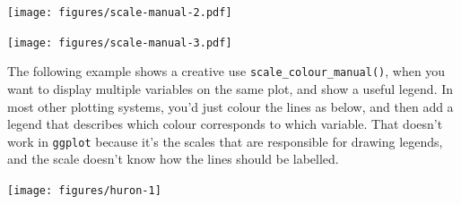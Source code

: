 \texttt{[image: figures/scale-manual-2.pdf]}

\begin{Shaded}
\begin{Highlighting}[]
\StringTok{ }\NormalTok{(} \StringTok{ }
\StringTok{  }\NormalTok{(} \NormalTok{(}\NormalTok{, }\NormalTok{, }\NormalTok{, }\NormalTok{))}
\end{Highlighting}
\end{Shaded}

\texttt{[image: figures/scale-manual-3.pdf]}

The following example shows a creative use
\texttt{scale\_colour\_manual()}, when you want to display multiple
variables on the same plot, and show a useful legend. In most other
plotting systems, you'd just colour the lines as below, and then add a
legend that describes which colour corresponds to which variable. That
doesn't work in \texttt{ggplot} because it's the scales that are
responsible for drawing legends, and the scale doesn't know how the
lines should be labelled.

\begin{Shaded}
\begin{Highlighting}[]
\NormalTok{>}\StringTok{ }\StringTok{ }\NormalTok{(} \NormalTok{:}\NormalTok{, } 
\NormalTok{>}\StringTok{ }
\NormalTok{+}\StringTok{   }\NormalTok{(}\NormalTok{(} \StringTok{ }\NormalTok{), } \NormalTok{) +}\StringTok{ }
\NormalTok{+}\StringTok{   }\NormalTok{(}\NormalTok{(} \StringTok{ }\NormalTok{), } \NormalTok{)}
\end{Highlighting}
\end{Shaded}

\texttt{[image: figures/huron-1]}


